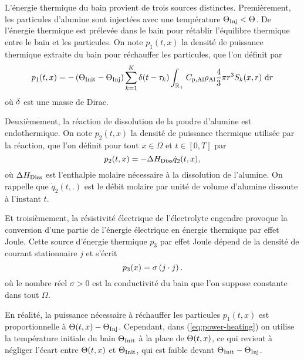 L'énergie thermique du bain provient de trois sources
distinctes. Premièrement, les particules d'alumine sont injectées avec
une température $\Theta_\text{Inj} < \Theta$. De l'énergie thermique est
prélevée dans le bain pour rétablir l'équilibre thermique entre le
bain et les particules. On note $p_1(t, x)$ la densité de puissance
thermique extraite du bain pour réchauffer les particules, que l'on
définit par
\begin{equation}\label{eq:power-heating}
  p_1(t, x) = -\left( \Theta_\text{Init}-\Theta_\text{Inj} \right)\sum_{k = 1}^{K}\delta(t -
  \tau_k)\int_{\mathbb R_+}C_{\mathrm{p,Al}}\rho_\mathrm{Al}\frac{4}{3}\pi r^3 S_k(x, r)\,\,\mathrm dr
\end{equation}
où $\delta$ est une masse de Dirac.

Deuxièmement, la réaction de dissolution de la poudre d'alumine est
endothermique. On note $p_2(t, x)$ la densité de puissance thermique
utilisée par la réaction, que l'on définit pour tout $x\in\Omega$ et
$t\in[0, T]$ par
\begin{equation}
p_2(t, x) = - \Delta H_\text{Diss} \dot q_2(t, x),
\end{equation}
où $\Delta H_\text{Diss}$ est l'enthalpie molaire nécessaire à
la dissolution de l'alumine. On rappelle que $\dot q_2(t, .)$ est le
débit molaire par unité de volume d'alumine dissoute à l'instant $t$.

Et troisièmement, la résistivité électrique de l'électrolyte engendre
provoque la conversion d'une partie de l'énergie électrique en énergie
thermique par effet Joule. Cette source d'énergie thermique $p_3$ par
effet Joule dépend de la densité de courant stationnaire $j$ et
s'écrit
\begin{equation}
p_3(x) = \sigma\left( j\cdot j \right).
\end{equation}
où le nombre réel $\sigma > 0$ est la conductivité du bain que l'on
suppose constante dans tout $\Omega$.

\begin{remarque}
  En réalité, la puissance nécessaire à réchauffer les particules
  $p_1(t, x)$ est proportionnelle à ${\Theta(t, x) -
    \Theta_\text{Inj}}$. Cependant, dans (\ref{eq:power-heating}) on utilise la
  température initiale du bain $\Theta_\text{Init}$ à la place de
  $\Theta(t, x)$, ce qui revient à négliger l'écart entre
  $\Theta(t, x)$ et $\Theta_\text{Init}$, qui est faible devant ${\Theta_\text{Init} -
  \Theta_\text{Inj}}$.
\end{remarque}

